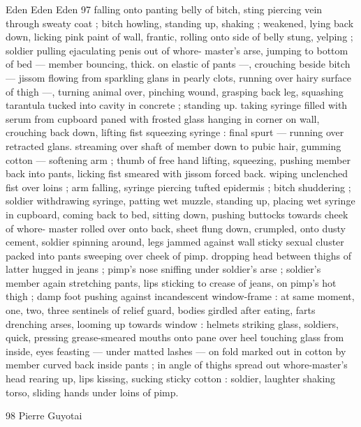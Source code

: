 Eden Eden Eden 97
falling onto panting belly of bitch, sting piercing vein through sweaty
coat ; bitch howling, standing up, shaking ; weakened, lying back
down, licking pink paint of wall, frantic, rolling onto side of belly
stung, yelping ; soldier pulling ejaculating penis out of whore-
master's arse, jumping to bottom of bed — member bouncing, thick.
on elastic of pants —, crouching beside bitch — jissom flowing from
sparkling glans in pearly clots, running over hairy surface of thigh
—, turning animal over, pinching wound, grasping back leg,
squashing tarantula tucked into cavity in concrete ; standing up.
taking syringe filled with serum from cupboard paned with frosted
glass hanging in corner on wall, crouching back down, lifting fist
squeezing syringe : final spurt — running over retracted glans.
streaming over shaft of member down to pubic hair, gumming cotton
— softening arm ; thumb of free hand lifting, squeezing, pushing
member back into pants, licking fist smeared with jissom forced back.
wiping unclenched fist over loins ; arm falling, syringe piercing tufted
epidermis ; bitch shuddering ; soldier withdrawing syringe, patting
wet muzzle, standing up, placing wet syringe in cupboard, coming
back to bed, sitting down, pushing buttocks towards cheek of whore-
master rolled over onto back, sheet flung down, crumpled, onto
dusty cement, soldier spinning around, legs jammed against wall
sticky sexual cluster packed into pants sweeping over cheek of pimp.
dropping head between thighs of latter hugged in jeans ; pimp’s
nose sniffing under soldier's arse ; soldier's member again
stretching pants, lips sticking to crease of jeans, on pimp's hot thigh
; damp foot pushing against incandescent window-frame : at same
moment, one, two, three sentinels of relief guard, bodies girdled
after eating, farts drenching arses, looming up towards window :
helmets striking glass, soldiers, quick, pressing grease-smeared
mouths onto pane over heel touching glass from inside, eyes
feasting — under matted lashes — on fold marked out in cotton by
member curved back inside pants ; in angle of thighs spread out
whore-master’s head rearing up, lips kissing, sucking sticky cotton :
soldier, laughter shaking torso, sliding hands under loins of pimp.

98 Pierre Guyotai


